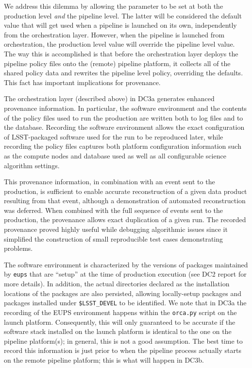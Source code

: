 We address this dilemma by allowing the parameter to be set at both
the production level {\it and} the pipeline level.  The latter will be
considered the default value that will get used when a pipeline is
launched on its own, independently from the orchestration layer.
However, when the pipeline is launched from orchestration, the
production level value will override the pipeline level value.  The
way this is accomplished is that before the orchestration layer
deploys the pipeline policy files onto the (remote) pipeline platform,
it collects all of the shared policy data and rewrites the pipeline
level policy, overriding the defaults.  This fact has important
implications for provenance.  


  \label{sec:provenance}

The orchestration layer (described above) in DC3a generates enhanced
provenance information.  In particular, the software environment and
the contents of the policy files used to run the production are
written both to log files and to the database.  Recording the software
environment allows the exact configuration of LSST-packaged software
used for the run to be reproduced later, while recording the policy
files captures both platform configuration information such as the
compute nodes and database used as well as all configurable science
algorithm settings.

This provenance information, in combination with an event sent to the
production, is sufficient to enable accurate reconstruction of a given
data product resulting from that event, although a demonstration of
automated reconstruction was deferred.  When combined with the full
sequence of events sent to the production, the provenance allows exact
duplication of a given run.  The recorded provenance proved highly
useful while debugging algorithmic issues since it simplified the
construction of small reproducible test cases demonstrating problems.

The software environment is characterized by the versions of packages
maintained by {\tt eups} that are ``setup'' at the time of production
execution (see DC2 report for more details).  In addition, the actual
directories declared as the installation locations of the packages are
also persisted, allowing locally-setup packages and packages installed
under {\tt \$LSST\_DEVEL} to be identified.  We note that in DC3a the
recording of the EUPS environment happens within the {\tt orca.py}
script on the launch platform.  Consequently, this will only
guaranteed to be accurate if the software stack installed on the
launch platform is identical to the one on the pipeline platform(s);
in general, this is not a good assumption.  The best time to record
this information is just prior to when the pipeline process actually
starts on the remote pipeline platform; this is what will happen in
DC3b.  

